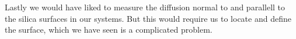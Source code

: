Lastly we would have liked to measure the diffusion normal to and parallell to the silica surfaces in our systems. But this would require us to locate and define the surface, which we have seen is a complicated problem.


